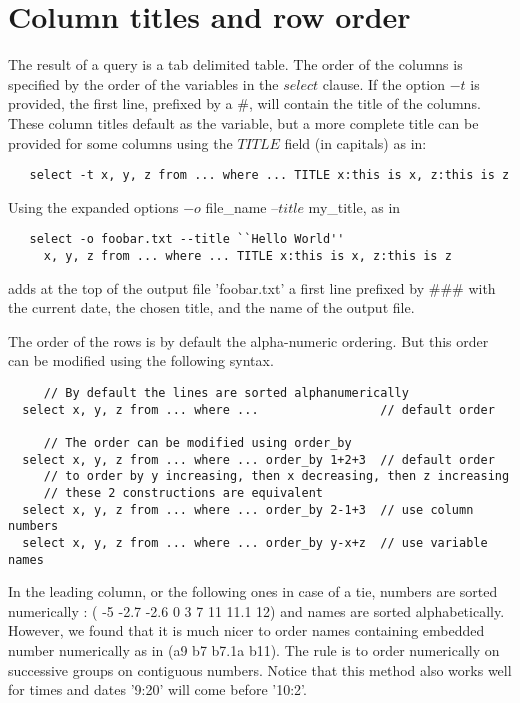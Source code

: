 \documentclass[11pt]{article}
\newcommand{\BL}{\begin{lstlisting}}
\begin{document}
\section{Column titles and row order}

The result of a query is a tab delimited table. 
The order of the columns is specified by the order of the variables in the $select$ clause.
If the option $-$$t$ is provided, the first line, prefixed by a \#, will contain the title of the columns.
These column titles default as the variable, but a more 
complete title can be provided for some columns using the $TITLE$ field (in capitals)  as in:
\BL
   select -t x, y, z from ... where ... TITLE x:this is x, z:this is z
\end{lstlisting}
Using the expanded options $-o$ file\_name --$title$ my\_title, as in 
\BL
   select -o foobar.txt --title ``Hello World''
     x, y, z from ... where ... TITLE x:this is x, z:this is z
\end{lstlisting}
adds at the top of the output file 'foobar.txt'
a first line prefixed by $\#\#\#$ with the current date, the chosen title, and the name of the output file.

The order of the rows is by default the alpha-numeric ordering.
But this order can be modified using the following syntax.

\BL
     // By default the lines are sorted alphanumerically
  select x, y, z from ... where ...                 // default order

     // The order can be modified using order_by
  select x, y, z from ... where ... order_by 1+2+3  // default order
     // to order by y increasing, then x decreasing, then z increasing
     // these 2 constructions are equivalent
  select x, y, z from ... where ... order_by 2-1+3  // use column numbers
  select x, y, z from ... where ... order_by y-x+z  // use variable names
\end{lstlisting}
In the leading column, or the following ones in case of a tie,
numbers are sorted numerically : ( -5 -2.7 -2.6 0 3 7 11 11.1 12) 
and names are sorted alphabetically. However, we found\cite {DTM94} that it is much nicer to
order names containing embedded number numerically as in (a9 b7 b7.1a b11). 
The rule is to order numerically on successive groups on contiguous numbers.
Notice that this method also works well for times and dates
'9:20' will come before '10:2'.

\end{document}
